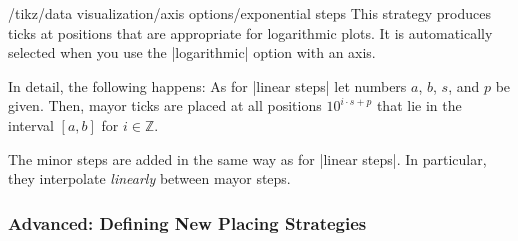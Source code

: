 \label{section-dv-exponential-strategy}

\begin{key}{/tikz/data visualization/axis options/exponential steps}
  This strategy produces ticks at positions that are appropriate for
  logarithmic plots. It is automatically selected when you use the
  |logarithmic| option with an axis.

  In detail, the following happens: As for |linear steps| let numbers
  $a$, $b$, $s$, and $p$ be given. Then, mayor ticks are placed at all
  positions $10^{i\cdot s+p}$ that lie in the interval $[a,b]$ for $i
  \in \mathbb Z$.

  The minor steps are added in the same way as for |linear steps|. In
  particular, they interpolate \emph{linearly} between mayor steps.

\begin{codeexample}[]
\end{codeexample}
\end{key}



\subsubsection{Advanced: Defining New Placing Strategies}

